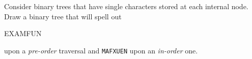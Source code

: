 Consider binary trees that have single characters stored at each
internal node.  Draw a binary tree that  will spell out {\tt

EXAMFUN} upon a {\it pre-order} traversal and {\tt MAFXUEN}
upon an {\it in-order} one. 

